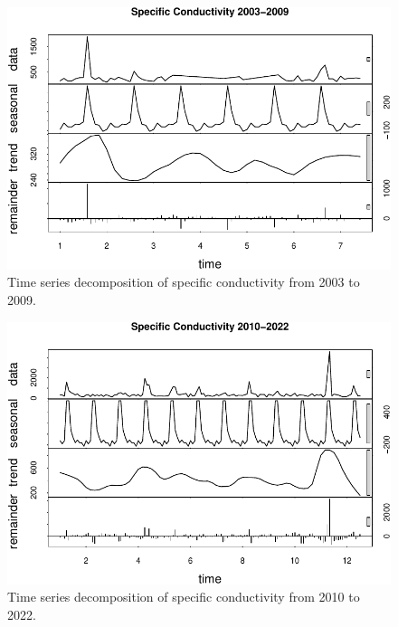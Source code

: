 \documentclass[
  12pt,
]{article}
\begin{document}
\begin{figure}

{\centering \includegraphics{Fischer_WDA_FinalProject_files/figure-latex/Plot of Early Specific Conductivity Time Series Decomposition-1} 

}

\caption{Time series decomposition of specific conductivity from 2003 to 2009.}\label{fig:Plot of Early Specific Conductivity Time Series Decomposition}
\end{figure}

\begin{figure}

{\centering \includegraphics{Fischer_WDA_FinalProject_files/figure-latex/Plot of Late Specific Conductivity Time Series Decomposition-1} 

}

\caption{Time series decomposition of specific conductivity from 2010 to 2022.}\label{fig:Plot of Late Specific Conductivity Time Series Decomposition}
\end{figure}
\end{document}
